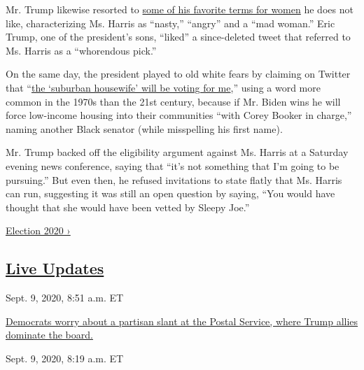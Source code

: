 Mr. Trump likewise resorted to
\href{https://www.nytimes3xbfgragh.onion/2020/08/14/arts/trump-black-women-stereotypes.html}{some
of his favorite terms for women} he does not like, characterizing Ms.
Harris as ``nasty,'' ``angry'' and a ``mad woman.'' Eric Trump, one of
the president's sons, ``liked'' a since-deleted tweet that referred to
Ms. Harris as a ``whorendous pick.''

On the same day, the president played to old white fears by claiming on
Twitter that
``\href{https://twitter.com/realDonaldTrump/status/1293517514798960640}{the
`suburban housewife' will be voting for me},'' using a word more common
in the 1970s than the 21st century, because if Mr. Biden wins he will
force low-income housing into their communities ``with Corey Booker in
charge,'' naming another Black senator (while misspelling his first
name).

Mr. Trump backed off the eligibility argument against Ms. Harris at a
Saturday evening news conference, saying that ``it's not something that
I'm going to be pursuing.'' But even then, he refused invitations to
state flatly that Ms. Harris can run, suggesting it was still an open
question by saying, ``You would have thought that she would have been
vetted by Sleepy Joe.''

\href{https://www.nytimes3xbfgragh.onion/news-event/2020-election}{Election
2020 ›}

\hypertarget{live-updates}{%
\subsection{\texorpdfstring{\href{https://www.nytimes3xbfgragh.onion/live/2020/09/09/us/trump-vs-biden}{Live
Updates}}{Live Updates}}\label{live-updates}}

\href{https://www.nytimes3xbfgragh.onion/live/2020/09/09/us/trump-vs-biden\#democrats-worry-about-a-partisan-slant-at-the-postal-service-where-trump-allies-dominate-the-board}{}

Sept. 9, 2020, 8:51 a.m. ET

\href{https://www.nytimes3xbfgragh.onion/live/2020/09/09/us/trump-vs-biden\#democrats-worry-about-a-partisan-slant-at-the-postal-service-where-trump-allies-dominate-the-board}{Democrats
worry about a partisan slant at the Postal Service, where Trump allies
dominate the
board.}\href{https://www.nytimes3xbfgragh.onion/live/2020/09/09/us/trump-vs-biden\#the-nras-new-candidate-grades-show-a-continuing-decline}{}

Sept. 9, 2020, 8:19 a.m. ET


